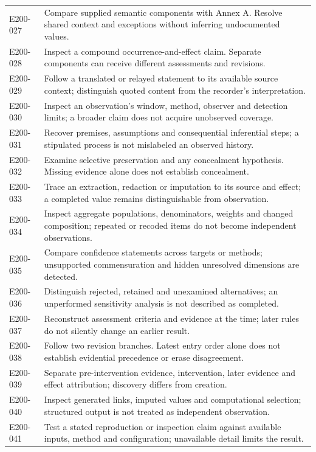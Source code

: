 \documentclass[11pt,a4paper]{article}
\begin{document}
\begin{longtable}{@{}L{0.16\textwidth}L{0.74\textwidth}@{}}
E200-027 & Compare supplied semantic components with Annex A. Resolve shared context and exceptions without inferring undocumented values. \\
E200-028 & Inspect a compound occurrence-and-effect claim. Separate components can receive different assessments and revisions. \\
E200-029 & Follow a translated or relayed statement to its available source context; distinguish quoted content from the recorder's interpretation. \\
E200-030 & Inspect an observation's window, method, observer and detection limits; a broader claim does not acquire unobserved coverage. \\
E200-031 & Recover premises, assumptions and consequential inferential steps; a stipulated process is not mislabeled an observed history. \\
E200-032 & Examine selective preservation and any concealment hypothesis. Missing evidence alone does not establish concealment. \\
E200-033 & Trace an extraction, redaction or imputation to its source and effect; a completed value remains distinguishable from observation. \\
E200-034 & Inspect aggregate populations, denominators, weights and changed composition; repeated or recoded items do not become independent observations. \\
E200-035 & Compare confidence statements across targets or methods; unsupported commensuration and hidden unresolved dimensions are detected. \\
E200-036 & Distinguish rejected, retained and unexamined alternatives; an unperformed sensitivity analysis is not described as completed. \\
E200-037 & Reconstruct assessment criteria and evidence at the time; later rules do not silently change an earlier result. \\
E200-038 & Follow two revision branches. Latest entry order alone does not establish evidential precedence or erase disagreement. \\
E200-039 & Separate pre-intervention evidence, intervention, later evidence and effect attribution; discovery differs from creation. \\
E200-040 & Inspect generated links, imputed values and computational selection; structured output is not treated as independent observation. \\
E200-041 & Test a stated reproduction or inspection claim against available inputs, method and configuration; unavailable detail limits the result. \\

\end{longtable}
\end{document}
